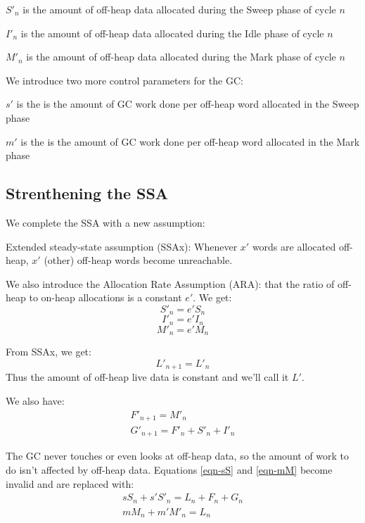 \documentclass{article}
\begin{document}
$S'_n$ is the amount of off-heap data allocated during the Sweep phase
of cycle $n$

$I'_n$ is the amount of off-heap data allocated during the Idle phase
of cycle $n$

$M'_n$ is the amount of off-heap data allocated during the Mark phase
of cycle $n$

We introduce two more control parameters for the GC:

$s'$ is the is the amount of GC work done per off-heap word allocated
in the Sweep phase

$m'$ is the is the amount of GC work done per off-heap word allocated
in the Mark phase

\subsection{Strenthening the SSA}

We complete the SSA with a new assumption:

Extended steady-state assumption (SSAx): Whenever $x'$ words are
allocated off-heap, $x'$ (other) off-heap words become unreachable.

We also introduce the Allocation Rate Assumption (ARA): that the ratio
of off-heap to on-heap allocations is a constant $e'$. We get:
\begin{equation}\label{eqn-S'}
S'_n = e' S_n
\end{equation}
\begin{equation}\label{eqn-I'}
I'_n = e' I_n
\end{equation}
\begin{equation}\label{eqn-M'}
M'_n = e' M_n
\end{equation}

From SSAx, we get:
\begin{equation}
L'_{n+1} = L'_n
\end{equation}
Thus the amount of off-heap live data is constant and we'll call it
$L'$.

We also have:
\begin{gather}
F'_{n+1} = M'_n    \label{eqn-F'} \\
G'_{n+1} = F'_n + S'_n + I'_n   \label{eqn-G'}
\end{gather}

The GC never touches or even looks at off-heap data, so the amount of
work to do isn't affected by off-heap data. Equations \eqref{eqn-sS} and
\eqref{eqn-mM} become invalid and are replaced with:
\begin{gather}
 sS_n + s'S'_n = L_n + F_n + G_n   \label{eqn-sS'} \\
 mM_n + m'M'_n = L_n   \label{eqn-mM'}
\end{gather}
\end{document}
